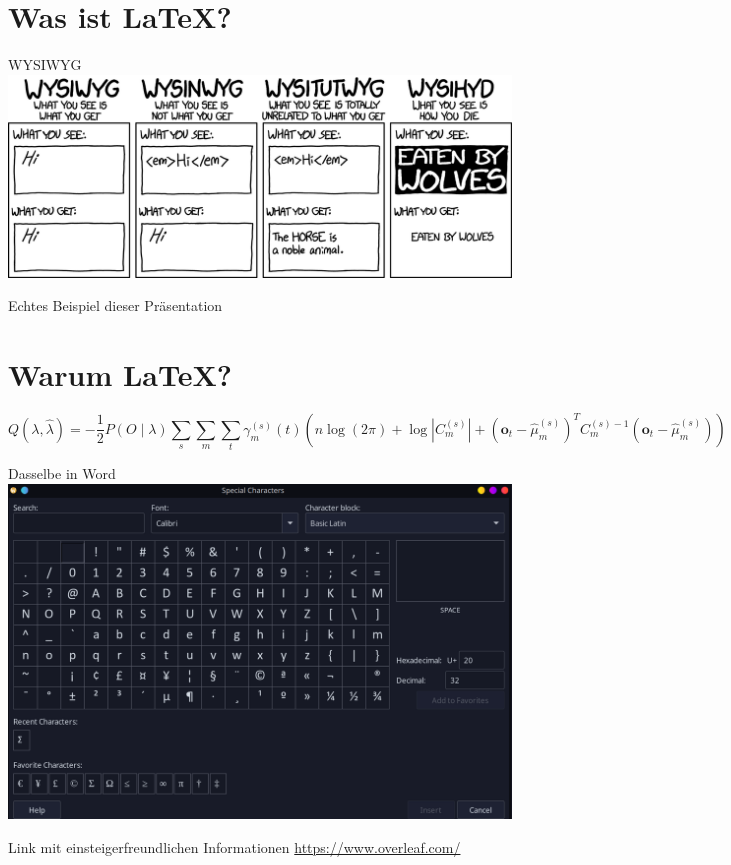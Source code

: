 \documentclass{beamer}
\begin{document}
  \section{Was ist \LaTeX?}
  \begin{frame}{WYSIWYG}
    \includegraphics[width=\textwidth]{types_of_editors_2x.png}
  \end{frame}
  \begin{frame}{Echtes Beispiel dieser Präsentation}
  \end{frame}
  \section{Warum \LaTeX?}
  \begin{frame}
\begin{dmath}
  Q(\lambda,\hat{\lambda}) = -\frac{1}{2} P{(O \mid \lambda )} \sum_s \sum_m \sum_t \gamma_m^{(s)} (t) \left( n \log(2 \pi ) + \log \left| C_m^{(s)} \right| + \left( \mathbf{o}_t - \hat{\mu}_m^{(s)} \right) ^T C_m^{(s)-1} \left(\mathbf{o}_t - \hat{\mu}_m^{(s)}\right) \right)
\end{dmath}
\end{frame}
\begin{frame}{Dasselbe in Word}
\href{https://i.makeagif.com/media/5-28-2022/dXcfrH.gif}{\includegraphics[width=\textwidth]{FormelnWord.png}}
\end{frame}
\begin{frame}{Link mit einsteigerfreundlichen Informationen}
\href{Link mit einsteigerfreundlichen Informationen}{https://www.overleaf.com/}
\end{frame}
\end{document}

